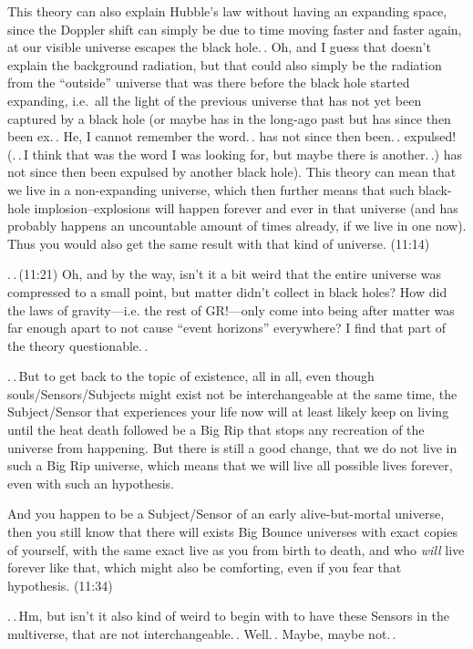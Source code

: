 \documentclass{report}
\begin{document}
This theory can also explain Hubble's law without having an expanding space, since the Doppler shift can simply be due to time moving faster and faster again, at our visible universe escapes the black hole.\,. Oh, and I guess that doesn't explain the background radiation, but that could also simply be the radiation from the ``outside'' universe that was there before the black hole started expanding, i.e.\ all the light of the previous universe that has not yet been captured by a black hole (or maybe has in the long-ago past but has since then been ex.\,. He, I cannot remember the word.\,. has not since then been.\,. expulsed! (.\,.\,I think that was the word I was looking for, but maybe there is another.\,.) has not since then been expulsed by another black hole). This theory can mean that we live in a non-expanding universe, which then further means that such black-hole implosion--explosions will happen forever and ever in that universe (and has probably happens an uncountable amount of times already, if we live in one now). Thus you would also get the same result with that kind of universe. (11:14)

.\,.\,(11:21) Oh, and by the way, isn't it a bit weird that the entire universe was compressed to a small point, but matter didn't collect in black holes? How did the laws of gravity---i.e. the rest of GR!---only come into being after matter was far enough apart to not cause ``event horizons'' everywhere? I find that part of the theory questionable.\,.

.\,.\,But to get back to the topic of existence, all in all, even though souls/Sensors/Subjects might exist not be interchangeable at the same time, the Subject/Sensor that experiences your life now will at least likely keep on living until the heat death followed be a Big Rip that stops any recreation of the universe from happening. But there is still a good change, that we do not live in such a Big Rip universe, which means that we will live all possible lives forever, even with such an hypothesis.

And you happen to be a Subject/Sensor of an early alive-but-mortal universe, then you still know that there will exists Big Bounce universes with exact copies of yourself, with the same exact live as you from birth to death, and who \emph{will} live forever like that, which might also be comforting, even if you fear that hypothesis. (11:34)

.\,.\,Hm, but isn't it also kind of weird to begin with to have these Sensors in the multiverse, that are not interchangeable.\,. Well.\,. Maybe, maybe not.\,.
\end{document}
